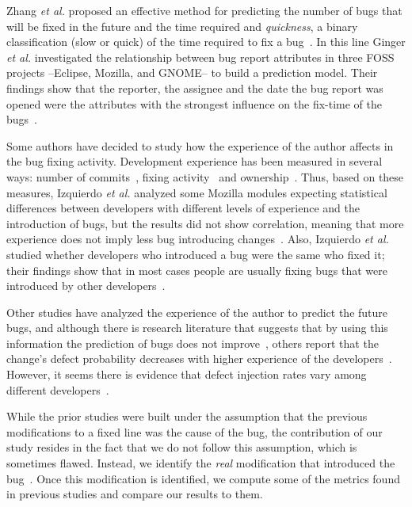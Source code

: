 \documentclass[10pt, conference]{IEEEtran}
\begin{document}

Zhang \emph{et al.} proposed an effective method for predicting the number of bugs that will be fixed in the future and the time required and \emph{quickness}, a binary classification (slow or quick) of the time required to fix a bug~\cite{zhang2013predicting}. In this line Ginger \emph{et al.} investigated the relationship between bug report attributes in three FOSS projects --Eclipse, Mozilla, and GNOME-- to build a prediction model. Their findings show that the reporter, the assignee and the date the bug report was opened were the attributes with the strongest influence on the fix-time of the bugs~\cite{giger2010predicting}.


Some authors have decided to study how the experience of the author affects in the bug fixing activity. Development experience has been measured in several ways: number of commits~\cite{eyolfson2011time}, fixing activity~\cite{ahsan2010mining} and ownership~\cite{german2004using}. Thus, based on these measures, Izquierdo \emph{et al.} analyzed some Mozilla modules expecting statistical differences between developers with different levels of experience and the introduction of bugs, but the results did not show correlation, meaning that more experience does not imply less bug introducing changes~\cite{izquierdo2012more}. Also, Izquierdo \emph{et al.} studied whether developers who introduced a bug were the same who fixed it; their findings show that in most cases people are usually fixing bugs that were introduced by other developers~\cite{izquierdo2011developers}.

Other studies have analyzed the experience of the author to predict the future bugs, and although there is research literature that suggests that by using this information the prediction of bugs does not improve~\cite{weyuker2010programmer}, others report that the change's defect probability decreases with higher experience of the developers~\cite{mockus2000predicting}. However, it seems there is evidence that defect injection rates vary among different developers~\cite{matsumoto2010analysis}.


While the prior studies were built under the assumption that the previous modifications to a fixed line was the cause of the bug, the contribution of our study resides in the fact that we do not follow this assumption, which is sometimes flawed. Instead, we identify the \emph{real} modification that introduced the bug~\cite{rodriguez2016bugtracking}. Once this modification is identified, we compute some of the metrics found in previous studies and compare our results to them.
\end{document}

